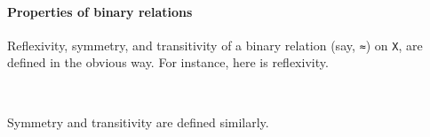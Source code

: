 \documentclass[a4paper,USenglish,cleveref,autoref,thm-restate]{lipics-v2019}
\begin{document}
\paragraph*{Properties of binary relations}\label{sec:properties-of-binary-relations}
Reflexivity, symmetry, and transitivity of a binary relation (say, \texttt{≈}) on \texttt{X}, are defined in the obvious way. For instance, here is reflexivity.
\begin{code}
\>[0]\AgdaSpace{}%
\AgdaSymbol{:}\AgdaSpace{}%
\AgdaSymbol{\{}\AgdaSpace{}%
\AgdaSymbol{:}\AgdaSpace{}%
\AgdaSpace{}%
\AgdaSpace{}%
\AgdaSymbol{\}}\AgdaSpace{}%
\AgdaSpace{}%
\AgdaSpace{}%
\AgdaSpace{}%
\AgdaSpace{}%
\AgdaSpace{}%
\AgdaSpace{}%
\AgdaSpace{}%
\AgdaSpace{}%
\<%
\\
\>[0]\AgdaSpace{}%
\AgdaSpace{}%
\AgdaSymbol{=}\AgdaSpace{}%
\AgdaSpace{}%
\AgdaSpace{}%
\AgdaSpace{}%
\AgdaSpace{}%
\AgdaSpace{}%
\<%
\end{code}
Symmetry and transitivity are defined similarly.
\end{document}
